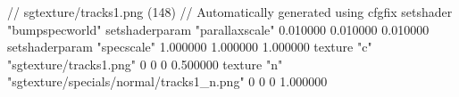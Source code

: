 // sgtexture/tracks1.png (148)
// Automatically generated using cfgfix
setshader "bumpspecworld"
setshaderparam "parallaxscale" 0.010000 0.010000 0.010000
setshaderparam "specscale" 1.000000 1.000000 1.000000
texture "c" "sgtexture/tracks1.png" 0 0 0 0.500000
texture "n" "sgtexture/specials/normal/tracks1_n.png" 0 0 0 1.000000
